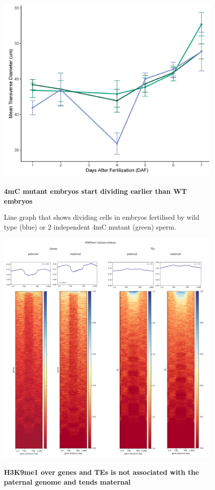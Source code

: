 \begin{figure}[htbp!] 
\centering    
    \includegraphics[width=1\textwidth]{Chapter3/Figs/Supps/FigureS4_transverse_diameter.pdf}
\caption{\textbf{4mC mutant embryos start dividing earlier than WT embryos}}
\label{fig:transverse_diameter}
\captionsetup{font=small}
    \caption*{Line graph that shows dividing cells in embryos fertilised by wild type (blue) or 2 independent 4mC mutant (green) sperm.}
\end{figure}

\begin{figure}[htbp!] 
\centering    
    \includegraphics[width=1\textwidth]{Chapter3/Figs/Supps/FigureS5_H3k9me1.pdf}
\caption{\textbf{H3K9me1 over genes and TEs is not associated with the paternal genome and tends maternal}}
\label{fig:h3k8me1}
\captionsetup{font=small}
    \caption*{}
\end{figure}

